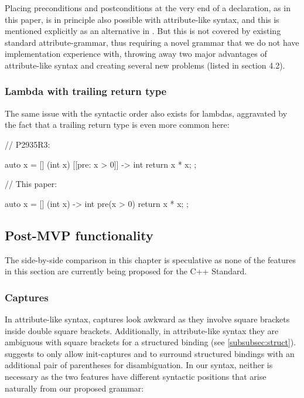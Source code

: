 Placing preconditions and postconditions at the very end of a declaration, as in this paper, is in principle also possible with attribute-like syntax, and this is mentioned explicitly as an alternative in \cite{P2935R3}. But this is not covered by existing standard attribute-grammar, thus requiring a novel grammar that we do not have implementation experience with, throwing away two major advantages of attribute-like syntax and creating several new problems (listed in \cite{P2935R3} section 4.2).

\subsubsection{Lambda with trailing return type}
The same issue with the syntactic order also exists for lambdas, aggravated by the fact that a trailing return type is even more common here:
\vspace{3mm}

\begin{minipage}{8cm}
\begin{codeblock}
// P2935R3:

auto x = [] (int x)
  [[pre: x > 0]] -> int { 
  return x * x; 
};
\end{codeblock}
\end{minipage}
\begin{minipage}{8cm}
\begin{codeblock}
// This paper:

auto x = [] (int x) -> int 
  pre(x > 0) { 
  return x * x; 
};
\end{codeblock}
\end{minipage}

\subsection{Post-MVP functionality}

The side-by-side comparison in this chapter is speculative as none of the features in this section are currently being proposed for the C++ Standard.

\subsubsection{Captures}
\label{subsubsec:comp_captures}

In attribute-like syntax, captures look awkward as they involve square brackets inside double square brackets. Additionally, in attribute-like syntax they are ambiguous with square brackets for a structured binding (see \ref{subsubsec:struct}). \cite{P2935R3} suggests to only allow init-captures and to surround structured bindings with an additional pair of parentheses for disambiguation. In our syntax, neither is necessary as the two features have different syntactic positions that arise naturally from our proposed grammar:

